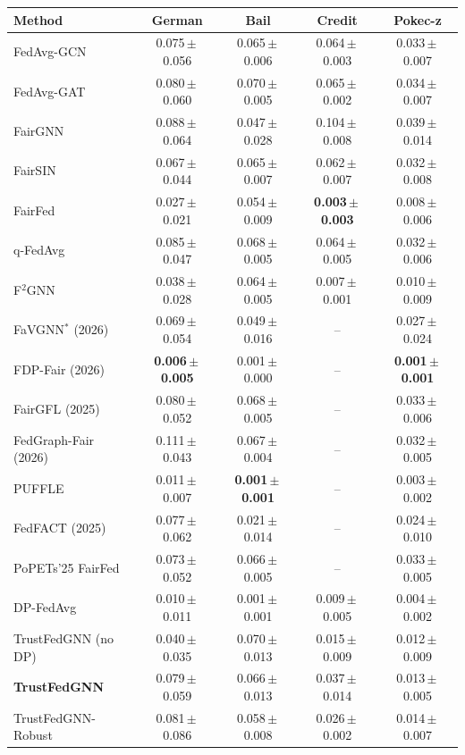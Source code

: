 \begin{tabular}{lcccc}
\toprule
Method & German & Bail & Credit & Pokec-z \\
\midrule
FedAvg-GCN & 0.075\,$\pm$\,0.056 & 0.065\,$\pm$\,0.006 & 0.064\,$\pm$\,0.003 & 0.033\,$\pm$\,0.007 \\
FedAvg-GAT & 0.080\,$\pm$\,0.060 & 0.070\,$\pm$\,0.005 & 0.065\,$\pm$\,0.002 & 0.034\,$\pm$\,0.007 \\
FairGNN & 0.088\,$\pm$\,0.064 & 0.047\,$\pm$\,0.028 & 0.104\,$\pm$\,0.008 & 0.039\,$\pm$\,0.014 \\
FairSIN & 0.067\,$\pm$\,0.044 & 0.065\,$\pm$\,0.007 & 0.062\,$\pm$\,0.007 & 0.032\,$\pm$\,0.008 \\
FairFed & 0.027\,$\pm$\,0.021 & 0.054\,$\pm$\,0.009 & \textbf{0.003\,$\pm$\,0.003} & 0.008\,$\pm$\,0.006 \\
q-FedAvg & 0.085\,$\pm$\,0.047 & 0.068\,$\pm$\,0.005 & 0.064\,$\pm$\,0.005 & 0.032\,$\pm$\,0.006 \\
F$^2$GNN & 0.038\,$\pm$\,0.028 & 0.064\,$\pm$\,0.005 & 0.007\,$\pm$\,0.001 & 0.010\,$\pm$\,0.009 \\
FaVGNN$^{\ast}$ (2026) & 0.069\,$\pm$\,0.054 & 0.049\,$\pm$\,0.016 & -- & 0.027\,$\pm$\,0.024 \\
FDP-Fair (2026) & \textbf{0.006\,$\pm$\,0.005} & 0.001\,$\pm$\,0.000 & -- & \textbf{0.001\,$\pm$\,0.001} \\
FairGFL (2025) & 0.080\,$\pm$\,0.052 & 0.068\,$\pm$\,0.005 & -- & 0.033\,$\pm$\,0.006 \\
FedGraph-Fair (2026) & 0.111\,$\pm$\,0.043 & 0.067\,$\pm$\,0.004 & -- & 0.032\,$\pm$\,0.005 \\
PUFFLE & 0.011\,$\pm$\,0.007 & \textbf{0.001\,$\pm$\,0.001} & -- & 0.003\,$\pm$\,0.002 \\
FedFACT (2025) & 0.077\,$\pm$\,0.062 & 0.021\,$\pm$\,0.014 & -- & 0.024\,$\pm$\,0.010 \\
PoPETs'25 FairFed & 0.073\,$\pm$\,0.052 & 0.066\,$\pm$\,0.005 & -- & 0.033\,$\pm$\,0.005 \\
\midrule
DP-FedAvg & 0.010\,$\pm$\,0.011 & 0.001\,$\pm$\,0.001 & 0.009\,$\pm$\,0.005 & 0.004\,$\pm$\,0.002 \\
TrustFedGNN (no DP) & 0.040\,$\pm$\,0.035 & 0.070\,$\pm$\,0.013 & 0.015\,$\pm$\,0.009 & 0.012\,$\pm$\,0.009 \\
\textbf{TrustFedGNN} & 0.079\,$\pm$\,0.059 & 0.066\,$\pm$\,0.013 & 0.037\,$\pm$\,0.014 & 0.013\,$\pm$\,0.005 \\
TrustFedGNN-Robust & 0.081\,$\pm$\,0.086 & 0.058\,$\pm$\,0.008 & 0.026\,$\pm$\,0.002 & 0.014\,$\pm$\,0.007 \\
\bottomrule
\end{tabular}
